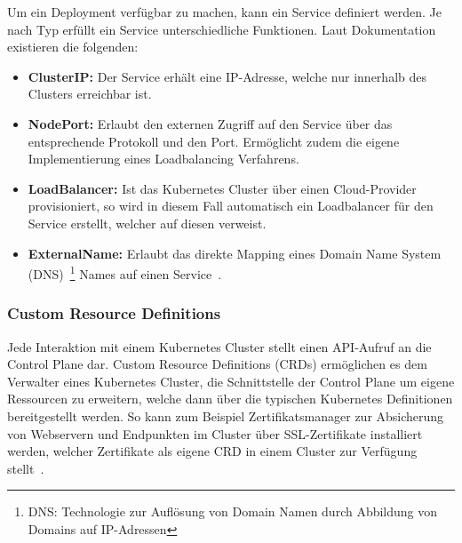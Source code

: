 Um ein Deployment verfügbar zu machen, kann ein Service definiert werden.
Je nach Typ erfüllt ein Service unterschiedliche Funktionen.
Laut Dokumentation~\cite{kubernetesservices} existieren die folgenden:

\begin{itemize}
    \item \textbf{ClusterIP:} Der Service erhält eine IP-Adresse, welche nur innerhalb des Clusters erreichbar ist.
    \item \textbf{NodePort:} Erlaubt den externen Zugriff auf den Service über das entsprechende Protokoll und den Port.
    Ermöglicht zudem die eigene Implementierung eines Loadbalancing Verfahrens.
    \item \textbf{LoadBalancer:} Ist das Kubernetes Cluster über einen Cloud-Provider provisioniert, so wird in diesem Fall automatisch ein Loadbalancer für den Service erstellt, welcher auf diesen verweist.
    \item \textbf{ExternalName:} Erlaubt das direkte Mapping eines Domain Name System (DNS)~\footnote{DNS: Technologie zur Auflösung von Domain Namen durch Abbildung von Domains auf IP-Adressen} Names auf einen Service~\cite{kubernetesservices}.
\end{itemize}

\subsubsection{Custom Resource Definitions}
Jede Interaktion mit einem Kubernetes Cluster stellt einen API-Aufruf an die Control Plane dar.
Custom Resource Definitions (CRDs) ermöglichen es dem Verwalter eines Kubernetes Cluster, die Schnittstelle der Control Plane um eigene Ressourcen zu erweitern, welche dann über die typischen Kubernetes Definitionen bereitgestellt werden.
So kann zum Beispiel Zertifikatsmanager zur Absicherung von Webservern und Endpunkten im Cluster über SSL-Zertifikate installiert werden, welcher Zertifikate als eigene CRD in einem Cluster zur Verfügung stellt~\cite{certman}.

\newpage
